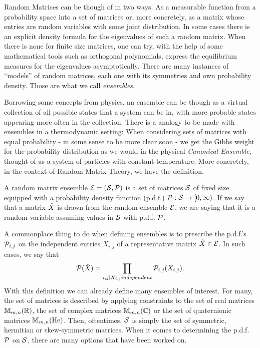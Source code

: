 Random Matrices can be though of in two ways: As a measurable function from a probability space into a set of matrices or, more concretely, as a matrix whose entries are random variables with some joint distribution. In some cases there is an explicit density formula for the eigenvalues of such a random matrix. When there is none for finite size matrices, one can try, with the help of some mathematical tools such as orthogonal polynomials, express the equilibrium measures for the eigenvalues asymptotically. There are many instances of \enquote{models} of random matrices, each one with its symmetries and own probability density. Those are what we call \textit{ensembles}. 

Borrowing some concepts from physics, an ensemble can be though as a virtual collection of all possible states that a system can be in, with more probable states appearing more often in the collection. There is a analogy to be made with ensembles in a thermodynamic setting: When considering sets of matrices with equal probability - in some sense to be more clear soon - we get the Gibbs weight for the probability distribution as we would in the physical \textit{Canonical Ensemble}, thought of as a system of particles with constant temperature. More concretely, in the context of Random Matrix Theory, we have the definition.

\begin{definition}
	A random matrix ensemble $\mathcal{E} = (\mathcal{S}, \mathcal{P})$ is a set of matrices $\mathcal{S}$ of fixed size equipped with a probability density function (p.d.f.) $\mathcal{P}: \mathcal{S} \rightarrow [0, \infty)$. If we say that a matrix $\hat X$ is drawn from the random ensemble $\mathcal{E}$, we are saying that it is a random variable assuming values in $\mathcal{S}$ with p.d.f. $\mathcal{P}$.
	\label{Def: Intro Ensemble}
\end{definition}

A commonplace thing to do when defining ensembles is to prescribe the p.d.f.'s $\mathcal{P}_{i,j}$ on the independent entries $X_{i,j}$ of a representative matrix $\hat X \in \mathcal{E}$. In such cases, we say that
\begin{equation}
	\mathcal{P}(\hat X) = \prod_{i,j | X_{i,j} independent} \mathcal{P}_{i,j}(X_{i,j}).
\end{equation}
With this definition we can already define many ensembles of interest. For many, the set of matrices is described by applying constraints to the set of real matrices $\mathbb{M}_{m,n}(\mathbb{R})$, the set of complex matrices $\mathbb{M}_{m,n}(\mathbb{C})$ or the set of quaternionic matrices $\mathbb{M}_{m,n}(\mathrm{He})$. Then, oftentimes, $\mathcal{S}$ is simply the set of symmetric, hermitian or skew-symmetric matrices. When it comes to determining the p.d.f. $\mathcal{P}$ on $\mathcal{S}$, there are many options that have been worked on.

